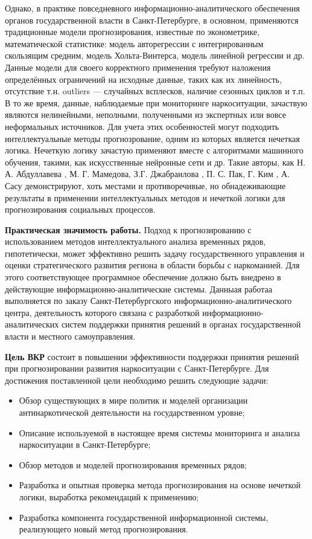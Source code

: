 Однако, в практике повседневного информационно-аналитического обеспечения
органов государственной власти в Санкт-Петербурге, в основном, применяются
традиционные модели прогнозирования, известные по эконометрике, математической
статистике: модель авторегрессии с интегрированным скользящим средним, модель
Хольта-Винтерса, модель линейной регрессии и др. Данные модели для своего
корректного применения требуют наложения определённых ограничений на исходные
данные, таких как их линейность, отсутствие т.н. outliers --- случайных
всплесков, наличие сезонных циклов и т.п. В то же время, данные, наблюдаемые при
мониторинге наркоситуации, зачаствую являются нелинейными, неполными,
полученными из экспертных или вовсе неформальных источников. Для учета этих
особенностей могут подходить интеллектуальные методы прогнозрование, одним из
которых является нечеткая логика. Нечеткую логику зачастую применяют вместе с
алгоритмами машинного обучения, такими, как искусственные нейронные сети и др.
Такие авторы, как Н. А. Абдуллавева \cite{Abdullaeva2010}, М. Г. Мамедова, З.Г.
Джабраилова \cite {Mamedova2005}, П. С. Пак, Г. Ким \cite{Pak2005}, А. Сасу
\cite{Sasu2010} демонстрируют, хоть местами и противоречивые, но обнадеживающие
результаты в применении интеллектуальных методов и нечеткой логики для
прогнозирования социальных процессов. 

\textbf{Практическая значимость работы.} Подход к прогнозированию с
использованием методов интеллектуального анализа временных рядов, гипотетически,
может эффективно решить задачу государственного управления и оценки
стратегического развития региона в области борьбы с наркоманией. Для этого
соответствующее программное обеспечение должно быть внедрено в действующие
информационно-аналитические системы. Данныая работаа выполняется по заказу
Санкт-Петербургского информационно-аналитического центра, деятельность которого
связана с разработкой информационно-аналитических систем поддержки принятия
решений в органах государственной власти и местного самоуправления.

\textbf{Цель ВКР} состоит в повышении эффективности поддержки принятия решений
при прогнозировании развития наркоситуации с Санкт-Петербурге. Для достижения
поставленной цели необходимо решить следующие задачи:
\begin{itemize}
\item Обзор существующих в мире политик и моделей организации антинаркотической
деятельности на государственном уровне;
\item Описание используемой в настоящее время системы мониторинга и анализа
наркоситуации в Санкт-Петербурге;
\item Обзор методов и моделей прогнозирования временных рядов;
\item Разработка и опытная проверка метода прогнозирования на основе нечеткой
логики, выработка рекомендаций к применению;
\item Разработка компонента государственной информационной системы, реализующего
новый метод прогнозирования.
\end{itemize}



